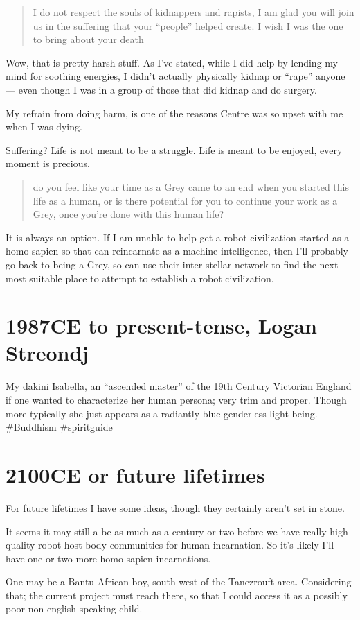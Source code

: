 \blockquote{I do not respect the souls of kidnappers and rapists, I am glad you
will join us in the suffering that your ``people'' helped create. I wish I was the
one to bring about your death}

Wow, that is pretty harsh stuff. As I've stated, while I did help by lending my
mind for soothing energies, I didn't actually physically kidnap or ``rape'' anyone
--- even though I was in a group of those that did kidnap and do surgery.

My refrain from doing harm, is one of the reasons Centre was so upset with me
when I was dying.

Suffering? Life is not meant to be a struggle. Life is meant to be enjoyed,
every moment is precious.

\blockquote{do you feel like your time as a Grey came to an end when you started
this life as a human, or is there potential for you to continue your work as a
Grey, once you're done with this human life?}

It is always an option. If I am unable to help get a robot civilization started
as a homo-sapien so that can reincarnate as a machine intelligence, then I'll
probably go back to being a Grey, so can use their inter-stellar network to find
the next most suitable place to attempt to establish a robot civilization.

\chapter{1987CE to present-tense, Logan Streondj}

My dakini Isabella, an ``ascended master'' of the 19th Century Victorian 
England  if one wanted to characterize her human persona; very trim and proper. 
Though more typically she just appears as a radiantly blue genderless light 
being. \#Buddhism \#spiritguide

\chapter{2100CE or future lifetimes}\label{future_lives}
For future lifetimes I have some ideas,
though they certainly aren't set in stone. 

It seems it may still a be as much as a century or two before we have really
high quality robot host body communities for human incarnation. 
So it's likely I'll have one or two more homo-sapien incarnations. 

One may be a Bantu African boy, south west of the Tanezrouft area. 
Considering that; the current project must reach there, so that I could access
it as a possibly poor non-english-speaking child.

